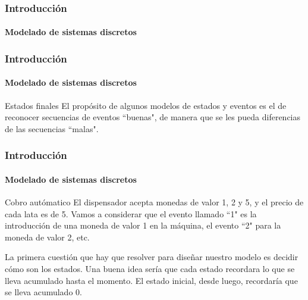 \documentclass{beamer}
\begin{document}
		\begin{frame}
			\frametitle{Introducci\'on}
			\framesubtitle{Modelado de sistemas discretos}

			\begin{center}
			\end{center}
		\end{frame}

		\begin{frame}
			\frametitle{Introducci\'on}
			\framesubtitle{Modelado de sistemas discretos}

            \begin{block}{Estados finales}
                El prop\'osito de algunos modelos de estados y eventos es el de reconocer secuencias de eventos ``buenas", de manera que se les pueda diferencias de las secuencias ``malas".
            \end{block}
		\end{frame}

		\begin{frame}
			\frametitle{Introducci\'on}
			\framesubtitle{Modelado de sistemas discretos}

            \begin{exampleblock}{Cobro aut\'omatico}
                El dispensador acepta monedas de valor 1, 2 y 5, y el precio de cada lata es de 5. Vamos a considerar que el evento llamado ``1" es la introducci\'on de una moneda de valor 1 en la m\'aquina, el evento ``2" para la moneda de valor 2, etc.
            \end{exampleblock}
            \begin{exampleblock}{}
                La primera cuesti\'on que hay que resolver para dise\~nar nuestro modelo es decidir c\'omo son los estados. Una buena idea ser\'ia que cada estado recordara lo que se lleva acumulado hasta el momento. El estado inicial, desde luego, recordar\'ia que se lleva acumulado 0. 
            \end{exampleblock}
		\end{frame}
\end{document}
